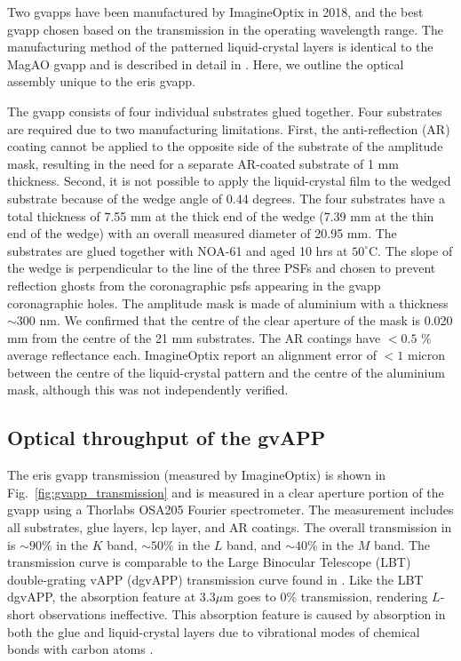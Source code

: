 \documentclass{aa}
\begin{document}
Two \acp{gvapp} have been manufactured by ImagineOptix in 2018, and the best \ac{gvapp} chosen based on the transmission in the operating wavelength range.
%
The manufacturing method of the patterned liquid-crystal layers is identical to the MagAO \ac{gvapp} \citep{otten2017sky} and is described in detail in \citet{kim2015fabrication}. 
%
Here, we outline the optical assembly unique to the \ac{eris} \ac{gvapp}. 

The \ac{gvapp} consists of four individual  substrates glued together.
%
Four substrates are required due to two manufacturing limitations.
%
First, the anti-reflection (AR) coating cannot be applied to the opposite side of the substrate of the amplitude mask, resulting in the need for a separate AR-coated substrate of 1 mm thickness. 
%
Second, it is not possible to apply the liquid-crystal film to the wedged substrate because of the wedge angle of 0.44 degrees.
%
The four substrates have a total thickness of 7.55 mm at the thick end of the wedge (7.39 mm at the thin end of the wedge) with an overall measured diameter of 20.95 mm.
%
The substrates are glued together with NOA-61 and aged 10 hrs at $50^\circ$C.
%
The slope of the wedge is perpendicular to the line of the three PSFs and chosen to prevent reflection ghosts from the coronagraphic \acp{psf} appearing in the \ac{gvapp} coronagraphic holes.
%
The amplitude mask is made of aluminium with a thickness $\sim 300$ nm.
%
We confirmed that the centre of the clear aperture of the mask is 0.020 mm from the centre of the 21 mm substrates.
%
The AR coatings have $< 0.5$ \% average reflectance each.
%
ImagineOptix report an alignment error of $<1$ micron between the centre of the liquid-crystal pattern and the centre of the aluminium mask, although this was not independently verified.

\subsection{Optical throughput of the gvAPP}\label{sec:optical_tput}
%
The \ac{eris} \ac{gvapp} transmission (measured by ImagineOptix) is shown in Fig.~\ref{fig:gvapp_transmission} and is measured in a clear aperture portion of the \ac{gvapp} using a Thorlabs OSA205 Fourier spectrometer. 
%
The measurement includes all substrates, glue layers, \ac{lcp} layer, and AR coatings.
%
The overall transmission in is $\sim 90\%$ in the $K$ band, $\sim 50\%$ in the $L$ band, and $\sim 40\%$ in the $M$ band.
%
The transmission curve is comparable to the Large Binocular Telescope (LBT) double-grating vAPP (dgvAPP) transmission curve found in \cite{2022AJ....163..217D}.
%
Like the LBT dgvAPP, the absorption feature at $3.3 \mu$m goes to 0\% transmission, rendering $L$-short observations ineffective. 
%
This absorption feature is caused by absorption in both the glue and liquid-crystal layers due to vibrational modes of chemical bonds with carbon atoms \citep{otten2017sky}.
\end{document}
